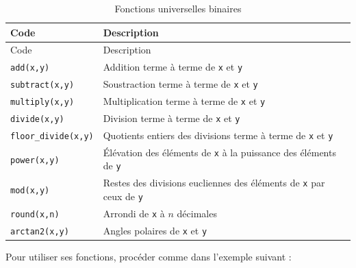 \documentclass[
  12pt,
]{book}
\numberwithin{equation}{section}
\numberwithin{countremarque}{section}
\begin{document}
\begin{longtable}[]{@{}
  >{\raggedleft\arraybackslash}p{}
  >{\raggedleft\arraybackslash}p{}@{}}
\caption{\label{tab:ufuncs-binaires} Fonctions universelles binaires}\tabularnewline
\toprule\noalign{}
\begin{minipage}[b]{\linewidth}\raggedleft
Code
\end{minipage} & \begin{minipage}[b]{\linewidth}\raggedleft
Description
\end{minipage} \\
\midrule\noalign{}
\endfirsthead
\toprule\noalign{}
\begin{minipage}[b]{\linewidth}\raggedleft
Code
\end{minipage} & \begin{minipage}[b]{\linewidth}\raggedleft
Description
\end{minipage} \\
\midrule\noalign{}
\endhead
\bottomrule\noalign{}
\endlastfoot
\texttt{add(x,y)} & Addition terme à terme de \texttt{x} et \texttt{y} \\
\texttt{subtract(x,y)} & Soustraction terme à terme de \texttt{x} et \texttt{y} \\
\texttt{multiply(x,y)} & Multiplication terme à terme de \texttt{x} et \texttt{y} \\
\texttt{divide(x,y)} & Division terme à terme de \texttt{x} et \texttt{y} \\
\texttt{floor\_divide(x,y)} & Quotients entiers des divisions terme à terme de \texttt{x} et \texttt{y} \\
\texttt{power(x,y)} & Élévation des éléments de \texttt{x} à la puissance des éléments de \texttt{y} \\
\texttt{mod(x,y)} & Restes des divisions eucliennes des éléments de \texttt{x} par ceux de \texttt{y} \\
\texttt{round(x,n)} & Arrondi de \texttt{x} à \(n\) décimales \\
\texttt{arctan2(x,y)} & Angles polaires de \texttt{x} et \texttt{y} \\
\end{longtable}

Pour utiliser ses fonctions, procéder comme dans l'exemple suivant :
\end{document}
